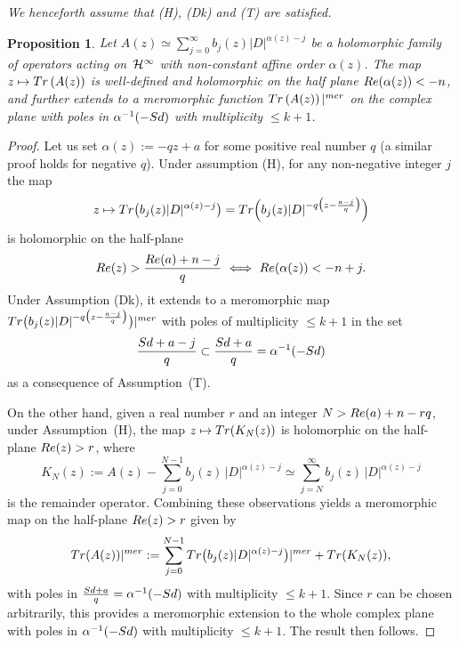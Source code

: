 \documentclass[11pt]{article}
\newtheorem{proposition}{Proposition}
\numberwithin{equation}{section}
\begin{document}
{\it  We henceforth assume that  {\rm (H)},    {\rm (Dk)} and {\rm (T)} are satisfied.}

\begin{proposition}\label{prop:merAz} Let $A(z)\simeq
    \sum\limits_{j=0}^\infty
b_j(z) \vert D\vert^{\alpha(z)-j} $ be a holomorphic
family of operators acting on~${\cal H}^\infty$ with non-constant affine order
  $\alpha(z)$.
The map
$z\mapsto  {\rm Tr} \left( A(z)\right)$ is well-defined and holomorphic on the
half plane ${\rm Re}(\alpha(z))< -n$,  and further extends to a meromorphic
 function ${\rm Tr} \left( A(z)\right)\vert^{\rm mer}$ on
the complex plane with  poles in $\alpha^{-1}(-{\rm Sd})$ with multiplicity $\leq k+1$.
\end{proposition}

\begin{proof} Let us set $\alpha(z):= -qz+a$ for some positive real
number $q$ (a similar proof holds for negative $q$). Under assumption (H), for any non-negative integer $j$ the map
\[
 z\mapsto {\rm Tr}\big(b_j(z) \vert
  D\vert^{\alpha(z)-j}\big)= {\rm Tr}\Big(b_j(z) \vert
  D\vert^{-q \big(z-\frac{a-j}{q} \big)}\Big)
  \] is holomorphic on the
   half-plane
   \[
   {\rm Re}(z)>\frac{{\rm Re}(a)+n-j}{q} \ \Longleftrightarrow \
    {\rm Re}(\alpha(z))<-n+j.
    \]
     Under Assumption (Dk), it extends to a meromorphic map $ {\rm Tr}\big(b_j(z) \vert
  D\vert^{-q \big(z-\frac{a-j}{q}\big)}\big)\vert^{\rm mer}$
  with poles of multiplicity $\leq k+1$  in the set \[
  \frac{{\rm Sd}+a-j}{q}\subset\frac{{\rm Sd}+a}{q}= \alpha^{-1 }(-{\rm Sd})
  \] as a consequence of Assumption~(T).

 On the other hand,   given a real number $r$ and an integer $N> {\rm Re}(a)+n-rq$, under Assumption~(H),  the map  $z\mapsto {\rm Tr}(K_N(z))$ is holomorphic on the half-plane ${\rm Re}(z)>r$, where
\[
K_N(z):= A(z)-\sum_{j=0}^{N-1}b_j(z)\, \vert D\vert^{\alpha(z)-j}\simeq
\sum_{j=N}^{\infty}b_j(z)\, \vert D\vert^{\alpha(z)-j}
\] is  the remainder
operator.  Combining these observations yields a meromorphic map on the
half-plane
 ${\rm Re}(z)>r$ given by
\[
{\rm Tr} ( A(z))\vert^{\rm mer}:=  \sum_{j=0}^{N-1}
{\rm Tr} \big(b_j(z) \vert D\vert^{\alpha(z)-j}\big)\vert^{\rm mer}+ {\rm
  Tr}(K_N(z)),
   \]
   with poles in $\frac{{\rm Sd}+a}{q}= \alpha^{-1 }(-{\rm Sd})$ with multiplicity $\leq k+1$. Since $r$ can be chosen arbitrarily, this provides a meromorphic extension to the whole complex plane with poles in $\alpha^{-1 }(-{\rm Sd})$ with multiplicity $\leq k+1$. The result then
 follows. \end{proof}
\end{document}
